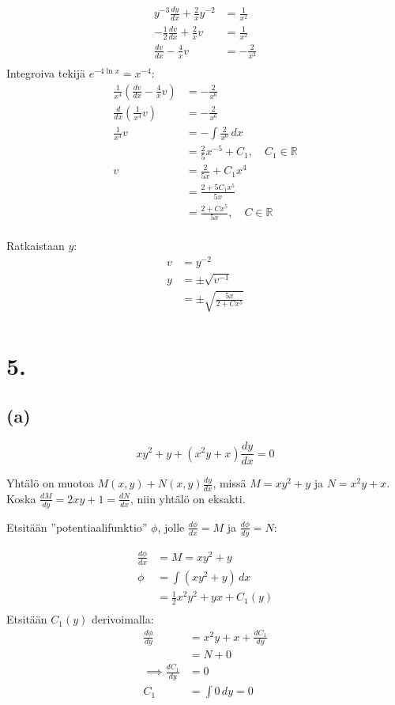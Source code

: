 \documentclass{article}
\begin{document}
\begin{align*}
  y^{-3}\frac{dy}{dx} + \frac{2}{x}y^{-2} &= \frac{1}{x^2} \\
  -\frac{1}{2}\frac{dv}{dx} + \frac{2}{x}v &= \frac{1}{x^2} \\
  \frac{dv}{dx} - \frac{4}{x}v &= -\frac{2}{x^2} \\
\end{align*}
Integroiva tekijä $e^{-4\ln x} = x^{-4}$:
\begin{align*}
  \frac{1}{x^4}(\frac{dv}{dx} - \frac{4}{x}v) &= -\frac{2}{x^6} \\
  \frac{d}{dx}(\frac{1}{x^4}v) &= -\frac{2}{x^6} \\
  \frac{1}{x^4}v &= -\int \frac{2}{x^6}\,dx \\
                 &= \frac{2}{5}x^{-5} + C_1, \quad C_1 \in \mathbb{R} \\
  v &= \frac{2}{5x} + C_1x^4 \\
    &= \frac{2 + 5C_1x^5}{5x} \\
    &= \frac{2 + Cx^5}{5x}, \quad C \in \mathbb{R} \\
\end{align*}

Ratkaistaan $y$:
\begin{align*}
  v &= y^{-2} \\
  y &= \pm \sqrt{v^{-1}} \\
    &= \pm \sqrt{\frac{5x}{2 + Cx^5}} \\
\end{align*}

\section*{5.}

\subsection*{(a)}

\[
  xy^2 + y + (x^2y + x)\frac{dy}{dx} = 0
\]

Yhtälö on muotoa $M(x, y) + N(x, y)\frac{dy}{dx}$,
missä $M = xy^2 + y$ ja $N = x^2y + x$.
Koska $\frac{dM}{dy} = 2xy + 1 = \frac{dN}{dx}$, niin yhtälö on eksakti.

Etsitään ''potentiaalifunktio'' $\phi$, jolle $\frac{d\phi}{dx} = M$ ja
$\frac{d\phi}{dy} = N$:

\begin{align*}
  \frac{d\phi}{dx} &= M = xy^2 + y \\
  \phi &= \int (xy^2 + y)\,dx \\
       &= \frac{1}{2}x^2y^2 + yx + C_1(y) \\
\end{align*}
Etsitään $C_1(y)$ derivoimalla:
\begin{align*}
  \frac{d\phi}{dy} &= x^2y + x + \frac{dC_1}{dy} \\
                   &= N + 0 \\
  \implies \frac{dC_1}{dy} &= 0 \\
  C_1 &= \int 0\,dy = 0 \\
\end{align*}
\end{document}
